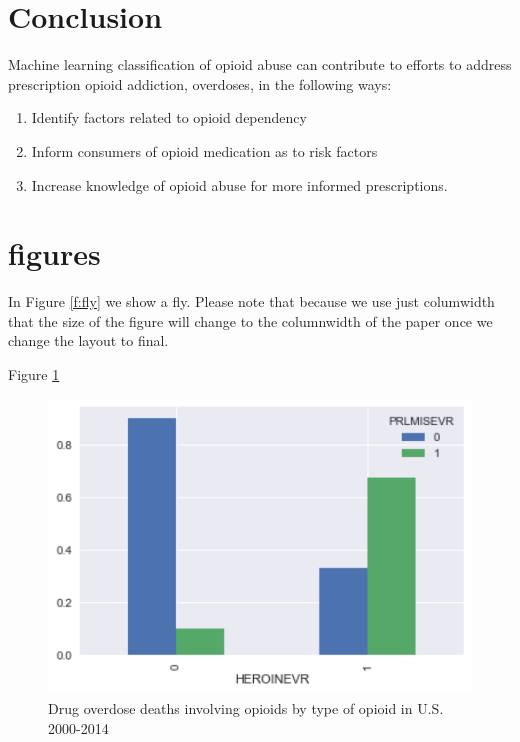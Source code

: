 \documentclass[sigconf]{acmart}
\begin{document}
\section{Conclusion}

Machine learning classification of opioid abuse can contribute to efforts to address prescription opioid addiction, overdoses, in the following ways: 
\begin{enumerate}
\item Identify factors related to opioid dependency
\item Inform consumers of opioid medication as to risk factors 
\item Increase knowledge of opioid abuse for more informed prescriptions. 
\end{enumerate}



\section{figures}

In Figure \ref{f:fly} we show a fly. Please note that because we use
just columwidth that the size of the figure will change to the
columnwidth of the paper once we change the layout to final. 

Figure \ref{f:Figure1} 

\begin{figure}[!ht]
  \centering\includegraphics[width=\columnwidth]{images/Figure1.pdf}
  \caption{Drug overdose deaths involving opioids by type of opioid in U.S. 2000-2014
  \cite{cdc16}}
  \label{f:Figure1}
\end{figure}
\end{document}
